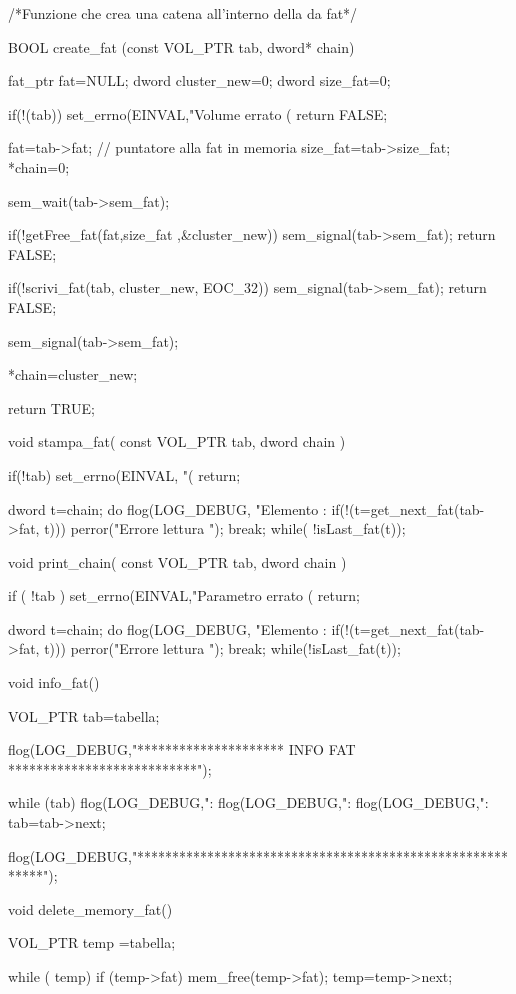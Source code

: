 /*Funzione che  crea una catena all'interno della da fat*/

BOOL create_fat (const VOL_PTR tab, dword* chain) { 
  
  

  fat_ptr fat=NULL; 
  dword cluster_new=0;
  dword size_fat=0; 
 
  if(!(tab)) {
    set_errno(EINVAL,"Volume errato (%
    return FALSE; 
  }
  
  
  fat=tab->fat; // puntatore alla fat in memoria
  size_fat=tab->size_fat;	
  *chain=0; 
  
  sem_wait(tab->sem_fat); 
  
  if(!getFree_fat(fat,size_fat ,&cluster_new)) {
     sem_signal(tab->sem_fat); 
    return FALSE; 
  } 
  
  if(!scrivi_fat(tab, cluster_new, EOC_32)) {
    sem_signal(tab->sem_fat); 
    return FALSE; 
  }
  
  sem_signal(tab->sem_fat); 
  
  *chain=cluster_new; 
  
  return TRUE; 
  
}

void stampa_fat( const VOL_PTR tab, dword chain ) {
  
  
    
    if(!tab) { 
	set_errno(EINVAL, "(%
	return; 
    }
    
    
    dword t=chain; 
    do {
	flog(LOG_DEBUG, "Elemento : %
	if(!(t=get_next_fat(tab->fat, t))) {
	  perror("Errore lettura ");
	  break; 
	}
    } while( !isLast_fat(t)); 
  
}

void print_chain( const VOL_PTR tab, dword chain ) {

  
  if ( !tab ) {
    set_errno(EINVAL,"Parametro errato (%
    return;
  }
  
    dword t=chain; 
    do {
	flog(LOG_DEBUG, "Elemento : %
	if(!(t=get_next_fat(tab->fat, t))) {
	  perror("Errore lettura ");
	  break; 
	}
    } while(!isLast_fat(t)); 
    
}


void info_fat() { 
   
    VOL_PTR tab=tabella; 
  
   flog(LOG_DEBUG,"********************* INFO FAT ***************************"); 
   
   while (tab) {
	  flog(LOG_DEBUG,"\tVOLUME : %
	  flog(LOG_DEBUG,"\tADDR   : %
	  flog(LOG_DEBUG,"\tSIZE   : %
	  tab=tab->next; 
   }
   
   flog(LOG_DEBUG,"**********************************************************"); 
}

void delete_memory_fat() {
  
  VOL_PTR temp =tabella; 
  
  while ( temp) { 
      if (temp->fat) 
	mem_free(temp->fat); 
      temp=temp->next; 
  }
  
}

